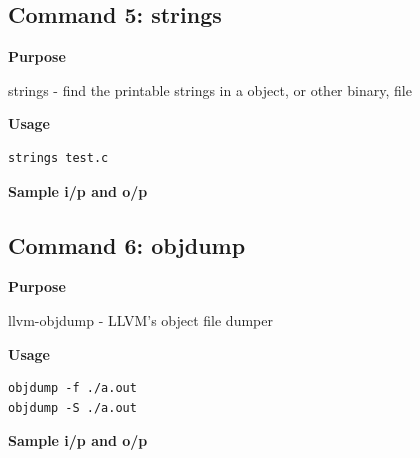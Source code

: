 \documentclass{article}
\begin{document}
\subsection{Command 5: strings} 
\textbf{Purpose}
\begin{flushleft}
       strings - find the printable strings in a object, or other binary, file
\end{flushleft}
\textbf{Usage}
\begin{verbatim}
strings test.c
\end{verbatim}
\textbf{Sample i/p and o/p}
\begin{figure}[H] 
\end{figure}
\subsection{Command 6: objdump} 
\textbf{Purpose}
\begin{flushleft}
       llvm-objdump - LLVM's object file dumper
\end{flushleft}
\textbf{Usage}
\begin{verbatim}
objdump -f ./a.out
objdump -S ./a.out
\end{verbatim}
\textbf{Sample i/p and o/p}
\begin{figure}[H] 
\end{figure}
\end{document}
